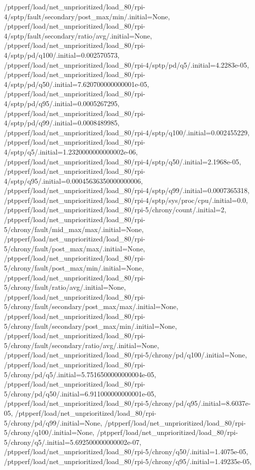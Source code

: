 {    /ptpperf/load/net_unprioritized/load_80/rpi-4/sptp/fault/secondary/post_max/min/.initial=None,
    /ptpperf/load/net_unprioritized/load_80/rpi-4/sptp/fault/secondary/ratio/avg/.initial=None,
    /ptpperf/load/net_unprioritized/load_80/rpi-4/sptp/pd/q100/.initial=0.002570573,
    /ptpperf/load/net_unprioritized/load_80/rpi-4/sptp/pd/q5/.initial=4.2283e-05,
    /ptpperf/load/net_unprioritized/load_80/rpi-4/sptp/pd/q50/.initial=7.620700000000001e-05,
    /ptpperf/load/net_unprioritized/load_80/rpi-4/sptp/pd/q95/.initial=0.0005267295,
    /ptpperf/load/net_unprioritized/load_80/rpi-4/sptp/pd/q99/.initial=0.0008489985,
    /ptpperf/load/net_unprioritized/load_80/rpi-4/sptp/q100/.initial=0.002455229,
    /ptpperf/load/net_unprioritized/load_80/rpi-4/sptp/q5/.initial=1.2320000000000002e-06,
    /ptpperf/load/net_unprioritized/load_80/rpi-4/sptp/q50/.initial=2.1968e-05,
    /ptpperf/load/net_unprioritized/load_80/rpi-4/sptp/q95/.initial=0.00045636350000000006,
    /ptpperf/load/net_unprioritized/load_80/rpi-4/sptp/q99/.initial=0.0007365318,
    /ptpperf/load/net_unprioritized/load_80/rpi-4/sptp/sys/proc/cpu/.initial=0.0,
    /ptpperf/load/net_unprioritized/load_80/rpi-5/chrony/count/.initial=2,
    /ptpperf/load/net_unprioritized/load_80/rpi-5/chrony/fault/mid_max/max/.initial=None,
    /ptpperf/load/net_unprioritized/load_80/rpi-5/chrony/fault/post_max/max/.initial=None,
    /ptpperf/load/net_unprioritized/load_80/rpi-5/chrony/fault/post_max/min/.initial=None,
    /ptpperf/load/net_unprioritized/load_80/rpi-5/chrony/fault/ratio/avg/.initial=None,
    /ptpperf/load/net_unprioritized/load_80/rpi-5/chrony/fault/secondary/post_max/max/.initial=None,
    /ptpperf/load/net_unprioritized/load_80/rpi-5/chrony/fault/secondary/post_max/min/.initial=None,
    /ptpperf/load/net_unprioritized/load_80/rpi-5/chrony/fault/secondary/ratio/avg/.initial=None,
    /ptpperf/load/net_unprioritized/load_80/rpi-5/chrony/pd/q100/.initial=None,
    /ptpperf/load/net_unprioritized/load_80/rpi-5/chrony/pd/q5/.initial=5.7516500000000004e-05,
    /ptpperf/load/net_unprioritized/load_80/rpi-5/chrony/pd/q50/.initial=6.911000000000001e-05,
    /ptpperf/load/net_unprioritized/load_80/rpi-5/chrony/pd/q95/.initial=8.6037e-05,
    /ptpperf/load/net_unprioritized/load_80/rpi-5/chrony/pd/q99/.initial=None,
    /ptpperf/load/net_unprioritized/load_80/rpi-5/chrony/q100/.initial=None,
    /ptpperf/load/net_unprioritized/load_80/rpi-5/chrony/q5/.initial=5.692500000000002e-07,
    /ptpperf/load/net_unprioritized/load_80/rpi-5/chrony/q50/.initial=1.4075e-05,
    /ptpperf/load/net_unprioritized/load_80/rpi-5/chrony/q95/.initial=1.49235e-05,
}
